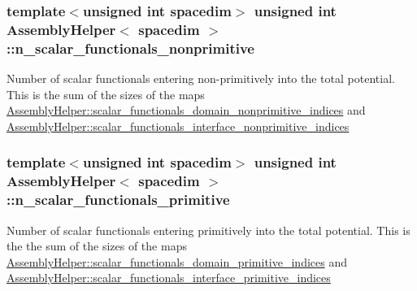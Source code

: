 \subsubsection[{\texorpdfstring{n\+\_\+scalar\+\_\+functionals\+\_\+nonprimitive}{n_scalar_functionals_nonprimitive}}]{\setlength{\rightskip}{0pt plus 5cm}template$<$unsigned int spacedim$>$ unsigned int {\bf Assembly\+Helper}$<$ spacedim $>$\+::n\+\_\+scalar\+\_\+functionals\+\_\+nonprimitive\hspace{0.3cm}{\ttfamily [private]}}\hypertarget{class_assembly_helper_af7bcfc1db651535a7aefc6071a81e124}{}\label{class_assembly_helper_af7bcfc1db651535a7aefc6071a81e124}
Number of scalar functionals entering non-\/primitively into the total potential. This is the sum of the sizes of the maps \hyperlink{class_assembly_helper_acf05fab2ddf57769a103d82a4f2d1cd3}{Assembly\+Helper\+::scalar\+\_\+functionals\+\_\+domain\+\_\+nonprimitive\+\_\+indices} and \hyperlink{class_assembly_helper_a0d15b3ab0c7bec9fc4f40e532f8776f4}{Assembly\+Helper\+::scalar\+\_\+functionals\+\_\+interface\+\_\+nonprimitive\+\_\+indices} 
\subsubsection[{\texorpdfstring{n\+\_\+scalar\+\_\+functionals\+\_\+primitive}{n_scalar_functionals_primitive}}]{\setlength{\rightskip}{0pt plus 5cm}template$<$unsigned int spacedim$>$ unsigned int {\bf Assembly\+Helper}$<$ spacedim $>$\+::n\+\_\+scalar\+\_\+functionals\+\_\+primitive\hspace{0.3cm}{\ttfamily [private]}}\hypertarget{class_assembly_helper_af5e03e8e47a85dbc96444ef61525c454}{}\label{class_assembly_helper_af5e03e8e47a85dbc96444ef61525c454}
Number of scalar functionals entering primitively into the total potential. This is the the sum of the sizes of the maps \hyperlink{class_assembly_helper_a4f08790a2235e48ce19f5d8d965a7874}{Assembly\+Helper\+::scalar\+\_\+functionals\+\_\+domain\+\_\+primitive\+\_\+indices} and \hyperlink{class_assembly_helper_ad99c75f32cf3f18aa1d4067ad8b56ae8}{Assembly\+Helper\+::scalar\+\_\+functionals\+\_\+interface\+\_\+primitive\+\_\+indices} 
